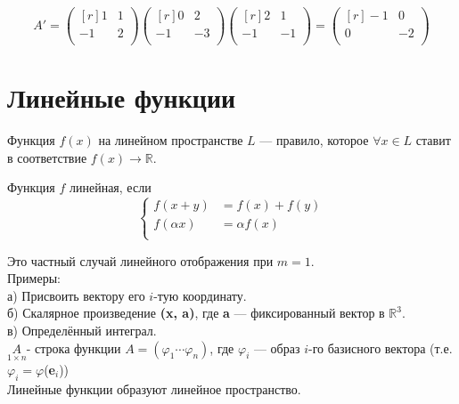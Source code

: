$$
A'=
\begin{pmatrix*}[r]
 1 & 1\\
 -1 & 2\\
\end{pmatrix*}
\begin{pmatrix*}[r]
 0 & 2\\
 -1 & -3\\
\end{pmatrix*}
\begin{pmatrix*}[r]
 2 & 1\\
 -1 & -1\\
\end{pmatrix*}
=
\begin{pmatrix*}[r]
 -1 & 0\\
 0 & -2\\
\end{pmatrix*}
$$
\section{Линейные функции}
Функция $f(x)$ на линейном пространстве $L$ --- правило, которое $\forall x \in L$ ставит в соответствие $f(x) \rightarrow \mathbb{R} $.

Функция $f$ линейная, если 
$$
\left\{
\begin{array}{rl} %
f(x+y)&=f(x)+f(y)\\
f(\alpha x)&=\alpha f(x)\\
\end{array}
\right.
$$

Это частный случай линейного отображения при $m=1$.\\
Примеры:\\ %
а) Присвоить вектору его $i$-тую координату.\\
б) Скалярное произведение \textbf{(\textbf{x}, \textbf{a})}, где \textbf{a} --- фиксированный вектор в $\mathbb{R}^3$.\\
в) Определённый интеграл.\\

$\underset{1 \times n}A$- строка функции $A=(\varphi_1 \cdots \varphi_n)$, где $\varphi_i$ --- образ $i$-го базисного вектора (т.е. $\varphi_i=\varphi$(\textbf{e$_i$}))\\

Линейные функции образуют линейное пространство.


